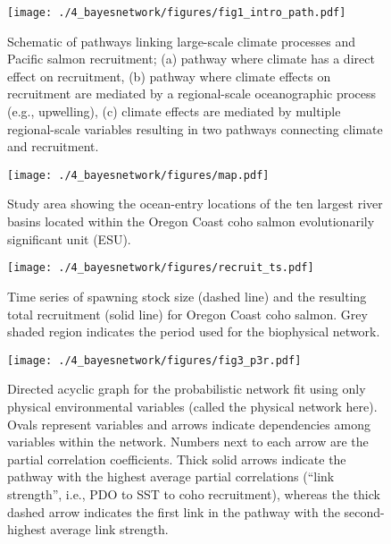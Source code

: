 \begin{figure}[htbp]
  \centering \texttt{[image: ./4\_bayesnetwork/figures/fig1\_intro\_path.pdf]}
  \caption[Schematic of pathways linking large-scale climate processes and
    Pacific salmon recruitment.]{Schematic of pathways linking large-scale
    climate processes and Pacific salmon recruitment; (a) pathway where
    climate has a direct effect on recruitment, (b) pathway where climate
    effects on recruitment are mediated by a regional-scale oceanographic
    process (e.g., upwelling), (c) climate effects are mediated by multiple
    regional-scale variables resulting in two pathways connecting climate and
    recruitment.}
  \label{fig:bn:1}
\end{figure}

\begin{figure}[htbp]
  \centering \texttt{[image: ./4\_bayesnetwork/figures/map.pdf]}
  \caption[Study area showing the ocean-entry locations of the ten largest river
    basins in the Oregon Coast ESU.]{Study area showing the ocean-entry
    locations of the ten largest river basins located within the Oregon Coast
    coho salmon evolutionarily significant unit (ESU).}
  \label{fig:bn:2}
\end{figure}

\begin{figure}[htbp]
  \centering \texttt{[image: ./4\_bayesnetwork/figures/recruit\_ts.pdf]}
  \caption[Time series of spawning stock size and the resulting
    total recruitment.]{Time series of spawning stock size (dashed line) and the
    resulting total recruitment (solid line) for Oregon Coast coho salmon.
    Grey shaded region indicates the period used for the biophysical network.}
  \label{fig:bn:3}
\end{figure}

\begin{figure}[htbp]
  \centering \texttt{[image: ./4\_bayesnetwork/figures/fig3\_p3r.pdf]}
  \caption[Directed acyclic graph for the probabilistic network fit using only
    physical environmental variables.]{Directed acyclic graph for the
    probabilistic network fit using only
    physical environmental variables (called the physical network here). Ovals
    represent variables and arrows indicate dependencies among variables within
    the network. Numbers next to each arrow are the partial correlation
    coefficients. Thick solid arrows indicate the pathway with the highest
    average partial correlations (``link strength'', i.e., PDO to SST to coho
    recruitment), whereas the thick dashed arrow indicates the first link in the
    pathway with the second-highest average link strength.}
  \label{fig:bn:4}
\end{figure}

